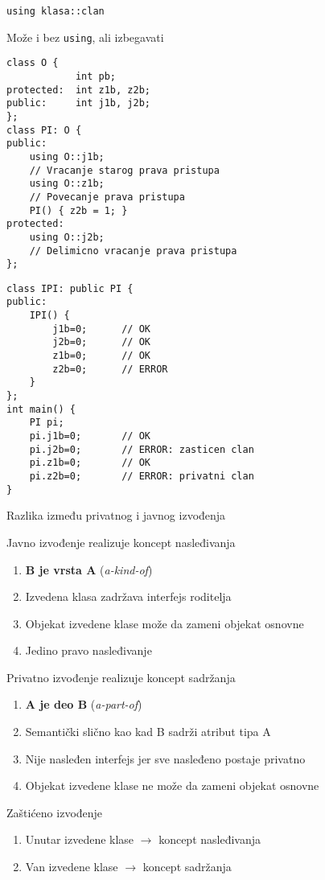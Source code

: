 \documentclass{article}
\newenvironment{xitemize}{%
    
    \itemize
    \larger
}{%
    \enditemize
}
\let\olditemize\itemize
\let\endolditemize\enditemize
\renewenvironment{itemize}{%
    \smaller
    \olditemize
}{%
    \endolditemize
}
\providecommand{\inlinecode}[1]{\texttt{#1}}
\begin{document}
\begin{xitemize}
\begin{itemize}
    \inlinecode{using klasa::clan}
    \item Može i bez \inlinecode{using}, ali izbegavati
    \begin{multicols}{2}
    \begin{lstlisting}
class O {
            int pb;
protected:  int z1b, z2b;
public:     int j1b, j2b;
};
class PI: O {
public:
    using O::j1b;   
    // Vracanje starog prava pristupa
    using O::z1b;   
    // Povecanje prava pristupa
    PI() { z2b = 1; }
protected:
    using O::j2b;   
    // Delimicno vracanje prava pristupa
};
\end{lstlisting}
    \columnbreak
        \begin{lstlisting}
class IPI: public PI {
public:
    IPI() {
        j1b=0;      // OK
        j2b=0;      // OK
        z1b=0;      // OK
        z2b=0;      // ERROR
    }
};
int main() {
    PI pi;
    pi.j1b=0;       // OK
    pi.j2b=0;       // ERROR: zasticen clan
    pi.z1b=0;       // OK
    pi.z2b=0;       // ERROR: privatni clan
}
    \end{lstlisting}
    \end{multicols}
  
\end{itemize}
\item Razlika između privatnog i javnog izvođenja
\begin{itemize}
    \item Javno izvođenje realizuje koncept nasleđivanja
    \begin{enumerate}
        \item \textbf{B je vrsta A} (\textit{a-kind-of})
        \item Izvedena klasa zadržava interfejs roditelja
        \item Objekat izvedene klase može da zameni objekat osnovne
        \item Jedino pravo nasleđivanje
    \end{enumerate}
    \item Privatno izvođenje realizuje koncept sadržanja
    \begin{enumerate}
        \item \textbf{A je deo B} (\textit{a-part-of})
        \item Semantički slično kao kad B sadrži atribut tipa A
        \item Nije nasleđen interfejs jer sve nasleđeno postaje privatno
        \item Objekat izvedene klase ne može da zameni objekat osnovne
    \end{enumerate}
    \item Zaštićeno izvođenje
    \begin{enumerate}
        \item Unutar izvedene klase $\rightarrow$ koncept nasleđivanja
        \item Van izvedene klase $\rightarrow$ koncept sadržanja
    \end{enumerate}
    
\end{itemize}
\end{xitemize}
\end{document}
